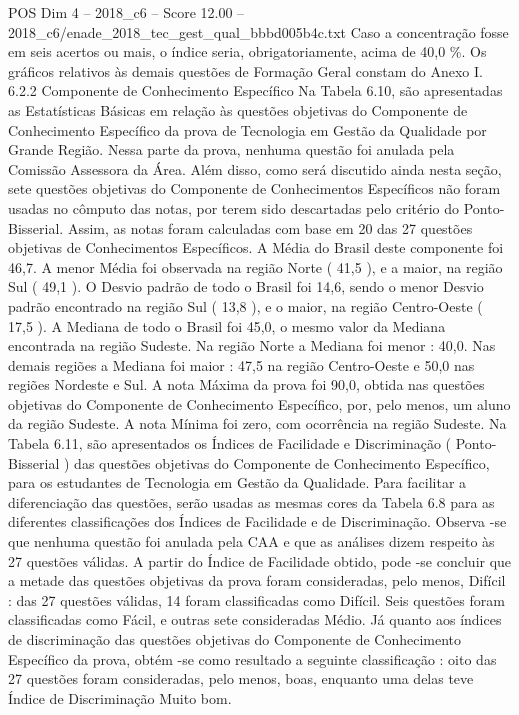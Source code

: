 \begin{textsample}{POS Dim 4 – 2018\_c6 – Score 12.00 – 2018\_c6/enade\_2018\_tec\_gest\_qual\_bbbd005b4c.txt}
Caso a concentração fosse em seis acertos ou mais, o índice seria, obrigatoriamente, acima de 40,0 \%.
Os gráficos relativos às demais questões de Formação Geral constam do Anexo I. 6.2.2 Componente de Conhecimento Específico Na Tabela 6.10, são apresentadas as Estatísticas Básicas em relação às questões objetivas do Componente de Conhecimento Específico da prova de Tecnologia em Gestão da Qualidade por Grande Região.
Nessa parte da prova, nenhuma questão foi anulada pela Comissão Assessora da Área.
Além disso, como será discutido ainda nesta seção, sete questões objetivas do Componente de Conhecimentos Específicos não foram usadas no cômputo das notas, por terem sido descartadas pelo critério do Ponto-Bisserial.
Assim, as notas foram calculadas com base em 20 das 27 questões objetivas de Conhecimentos Específicos.
A Média do Brasil deste componente foi 46,7.
A menor Média foi observada na região Norte ( 41,5 ), e a maior, na região Sul ( 49,1 ).
O Desvio padrão de todo o Brasil foi 14,6, sendo o menor Desvio padrão encontrado na região Sul ( 13,8 ), e o maior, na região Centro-Oeste ( 17,5 ).
A Mediana de todo o Brasil foi 45,0, o mesmo valor da Mediana encontrada na região Sudeste.
Na região Norte a Mediana foi menor : 40,0.
Nas demais regiões a Mediana foi maior : 47,5 na região Centro-Oeste e 50,0 nas regiões Nordeste e Sul.
A nota Máxima da prova foi 90,0, obtida nas questões objetivas do Componente de Conhecimento Específico, por, pelo menos, um aluno da região Sudeste.
A nota Mínima foi zero, com ocorrência na região Sudeste.
Na Tabela 6.11, são apresentados os Índices de Facilidade e Discriminação ( Ponto-Bisserial ) das questões objetivas do Componente de Conhecimento Específico, para os estudantes de Tecnologia em Gestão da Qualidade.
Para facilitar a diferenciação das questões, serão usadas as mesmas cores da Tabela 6.8 para as diferentes classificações dos Índices de Facilidade e de Discriminação.
Observa -se que nenhuma questão foi anulada pela CAA e que as análises dizem respeito às 27 questões válidas.
A partir do Índice de Facilidade obtido, pode -se concluir que a metade das questões objetivas da prova foram consideradas, pelo menos, Difícil : das 27 questões válidas, 14 foram classificadas como Difícil.
Seis questões foram classificadas como Fácil, e outras sete consideradas Médio.
Já quanto aos índices de discriminação das questões objetivas do Componente de Conhecimento Específico da prova, obtém -se como resultado a seguinte classificação : oito das 27 questões foram consideradas, pelo menos, boas, enquanto uma delas teve Índice de Discriminação Muito bom.

\end{textsample}

